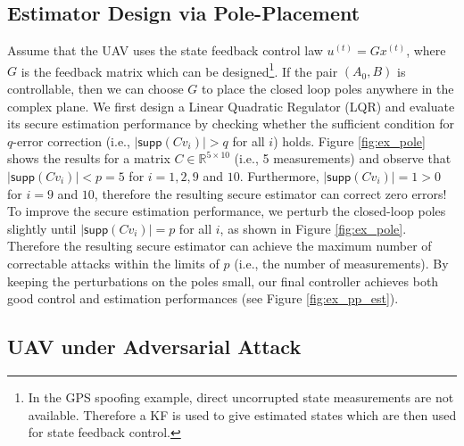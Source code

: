 \documentclass[twocolumn]{autart}    %
\newcommand{\rev}[1]{{\normalsize{{{\color{blue}#1}}}}}
\begin{document}
\subsection{\rev{Estimator} Design via Pole-Placement}
\vspace{-0.4cm}
Assume that the UAV uses the state feedback control law $u^{(t)} = G x^{(t)}$, where $G$ is the feedback matrix which can be designed\footnote{In the GPS spoofing example, direct uncorrupted state measurements are not available. Therefore a KF is used to give estimated states which are then used for state feedback control.}. If the pair $(A_0, B)$ is controllable, then we can choose $G$ to place the closed loop poles anywhere in the complex plane. We first design a Linear Quadratic Regulator (LQR) and evaluate its secure estimation performance by checking whether the sufficient condition for $q$-error correction  (i.e., $\lvert \textsf{supp} (C v_i) \rvert > q$ for all $i$) holds. 
Figure \ref{fig:ex_pole} shows the results for a matrix $C \in \mathbb{R}^{5\times 10}$ (i.e., 5 measurements) and observe that $\lvert \textsf{supp} (C v_i) \rvert < p = 5$ for $i=1,2,9$ and $10$. Furthermore, $\lvert \textsf{supp} (C v_i) \rvert = 1 > 0$ for $i = 9$ and $10$, therefore the resulting secure \rev{estimator} can correct zero errors!
To improve the secure estimation performance, we perturb the closed-loop poles slightly until $\lvert \textsf{supp} (C v_i) \rvert = p$ for all $i$, as shown in Figure \ref{fig:ex_pole}. Therefore the resulting secure \rev{estimator} can achieve the maximum number of correctable \rev{attacks} within the limits of $p$ (i.e., the number of measurements). By keeping the perturbations on the poles small, our final controller achieves both good control and estimation performances (see Figure \ref{fig:ex_pp_est}).%
\vspace{-0.4cm}
\subsection{UAV under Adversarial Attack}
\vspace{-0.4cm}
\end{document}
